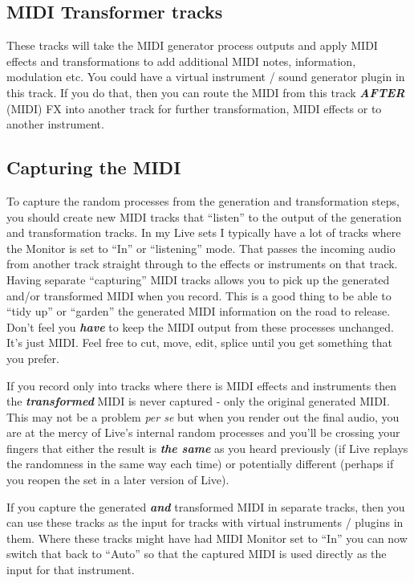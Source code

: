 \documentclass[
  12pt,
  letterpaper,
  oneside,
  open=any]{scrbook}
\begin{document}
\subsection{MIDI Transformer tracks}\label{midi-transformer-tracks}

These tracks will take the MIDI generator process outputs and apply MIDI
effects and transformations to add additional MIDI notes, information,
modulation etc. You could have a virtual instrument / sound generator
plugin in this track. If you do that, then you can route the MIDI from
this track \textbf{\emph{AFTER}} (MIDI) FX into another track for
further transformation, MIDI effects or to another instrument.

\subsection{Capturing the MIDI}\label{capturing-the-midi}

To capture the random processes from the generation and transformation
steps, you should create new MIDI tracks that ``listen'' to the output
of the generation and transformation tracks. In my Live sets I typically
have a lot of tracks where the Monitor is set to ``In'' or ``listening''
mode. That passes the incoming audio from another track straight through
to the effects or instruments on that track. Having separate
``capturing'' MIDI tracks allows you to pick up the generated and/or
transformed MIDI when you record. This is a good thing to be able to
``tidy up'' or ``garden'' the generated MIDI information on the road to
release. Don't feel you \textbf{\emph{have}} to keep the MIDI output
from these processes unchanged. It's just MIDI. Feel free to cut, move,
edit, splice until you get something that you prefer.

If you record only into tracks where there is MIDI effects and
instruments then the \textbf{\emph{transformed}} MIDI is never captured
- only the original generated MIDI. This may not be a problem \emph{per
se} but when you render out the final audio, you are at the mercy of
Live's internal random processes and you'll be crossing your fingers
that either the result is \textbf{\emph{the same}} as you heard
previously (if Live replays the randomness in the same way each time) or
potentially different (perhaps if you reopen the set in a later version
of Live).

If you capture the generated \textbf{\emph{and}} transformed MIDI in
separate tracks, then you can use these tracks as the input for tracks
with virtual instruments / plugins in them. Where these tracks might
have had MIDI Monitor set to ``In'' you can now switch that back to
``Auto'' so that the captured MIDI is used directly as the input for
that instrument.
\end{document}
